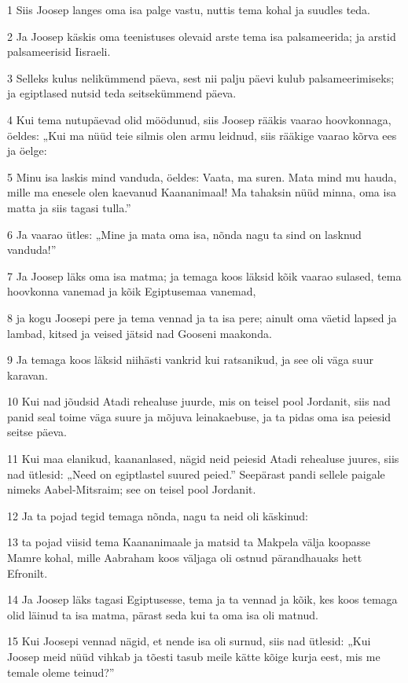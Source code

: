 \par 1 Siis Joosep langes oma isa palge vastu, nuttis tema kohal ja suudles teda.
\par 2 Ja Joosep käskis oma teenistuses olevaid arste tema isa palsameerida; ja arstid palsameerisid Iisraeli.
\par 3 Selleks kulus nelikümmend päeva, sest nii palju päevi kulub palsameerimiseks; ja egiptlased nutsid teda seitsekümmend päeva.
\par 4 Kui tema nutupäevad olid möödunud, siis Joosep rääkis vaarao hoovkonnaga, öeldes: „Kui ma nüüd teie silmis olen armu leidnud, siis rääkige vaarao kõrva ees ja öelge:
\par 5 Minu isa laskis mind vanduda, öeldes: Vaata, ma suren. Mata mind mu hauda, mille ma enesele olen kaevanud Kaananimaal! Ma tahaksin nüüd minna, oma isa matta ja siis tagasi tulla.”
\par 6 Ja vaarao ütles: „Mine ja mata oma isa, nõnda nagu ta sind on lasknud vanduda!”
\par 7 Ja Joosep läks oma isa matma; ja temaga koos läksid kõik vaarao sulased, tema hoovkonna vanemad ja kõik Egiptusemaa vanemad,
\par 8 ja kogu Joosepi pere ja tema vennad ja ta isa pere; ainult oma väetid lapsed ja lambad, kitsed ja veised jätsid nad Gooseni maakonda.
\par 9 Ja temaga koos läksid niihästi vankrid kui ratsanikud, ja see oli väga suur karavan.
\par 10 Kui nad jõudsid Atadi rehealuse juurde, mis on teisel pool Jordanit, siis nad panid seal toime väga suure ja mõjuva leinakaebuse, ja ta pidas oma isa peiesid seitse päeva.
\par 11 Kui maa elanikud, kaananlased, nägid neid peiesid Atadi rehealuse juures, siis nad ütlesid: „Need on egiptlastel suured peied.” Seepärast pandi sellele paigale nimeks Aabel-Mitsraim; see on teisel pool Jordanit.
\par 12 Ja ta pojad tegid temaga nõnda, nagu ta neid oli käskinud:
\par 13 ta pojad viisid tema Kaananimaale ja matsid ta Makpela välja koopasse Mamre kohal, mille Aabraham koos väljaga oli ostnud pärandhauaks hett Efronilt.
\par 14 Ja Joosep läks tagasi Egiptusesse, tema ja ta vennad ja kõik, kes koos temaga olid läinud ta isa matma, pärast seda kui ta oma isa oli matnud.
\par 15 Kui Joosepi vennad nägid, et nende isa oli surnud, siis nad ütlesid: „Kui Joosep meid nüüd vihkab ja tõesti tasub meile kätte kõige kurja eest, mis me temale oleme teinud?”
